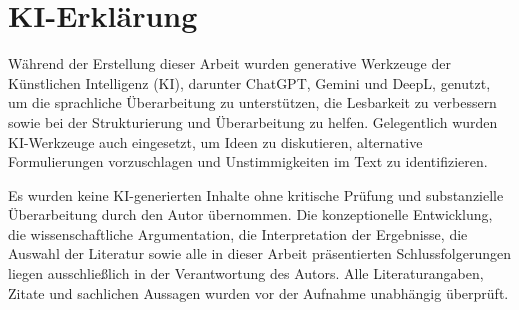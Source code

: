 \chapter{KI-Erklärung}\label{chap:ki-erklaerung}

Während der Erstellung dieser Arbeit wurden generative Werkzeuge der Künstlichen Intelligenz (KI), darunter ChatGPT, Gemini und DeepL, genutzt, um die sprachliche Überarbeitung zu unterstützen, die Lesbarkeit zu verbessern sowie bei der Strukturierung und Überarbeitung zu helfen. Gelegentlich wurden KI-Werkzeuge auch eingesetzt, um Ideen zu diskutieren, alternative Formulierungen vorzuschlagen und Unstimmigkeiten im Text zu identifizieren.

Es wurden keine KI-generierten Inhalte ohne kritische Prüfung und substanzielle Überarbeitung durch den Autor übernommen. Die konzeptionelle Entwicklung, die wissenschaftliche Argumentation, die Interpretation der Ergebnisse, die Auswahl der Literatur sowie alle in dieser Arbeit präsentierten Schlussfolgerungen liegen ausschließlich in der Verantwortung des Autors. Alle Literaturangaben, Zitate und sachlichen Aussagen wurden vor der Aufnahme unabhängig überprüft.